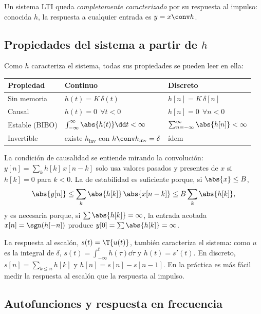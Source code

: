 \documentclass[11pt,a4paper]{scrartcl}
\begin{document}
\begin{importante}[Consecuencia]
  Un sistema LTI queda \emph{completamente caracterizado} por su respuesta al impulso: conocida $h$, la respuesta a cualquier entrada es $y=x\conv h$.
\end{importante}

\subsection{Propiedades del sistema a partir de $h$}

Como $h$ caracteriza el sistema, todas sus propiedades se pueden leer en ella:

\begin{center}
  \renewcommand{\arraystretch}{1.35}
  \begin{tabular}{@{}lll@{}}
    \toprule
    Propiedad & Continuo & Discreto\\\midrule
    Sin memoria & $h(t)=K\,\delta(t)$ & $h[n]=K\,\delta[n]$\\
    Causal & $h(t)=0\ \ \forall t<0$ & $h[n]=0\ \ \forall n<0$\\
    Estable (BIBO) & $\int_{-\infty}^{\infty}\abs{h(t)}\dd t<\infty$ & $\sum_{n=-\infty}^{\infty}\abs{h[n]}<\infty$\\
    Invertible & existe $h_{\mathrm{inv}}$ con $h\conv h_{\mathrm{inv}}=\delta$ & ídem\\\bottomrule
  \end{tabular}
\end{center}

La condición de causalidad se entiende mirando la convolución: $y[n]=\sum_kh[k]\,x[n-k]$ solo usa valores pasados y presentes de $x$ si $h[k]=0$ para $k<0$. La de estabilidad es suficiente porque, si $\abs{x}\le B$,
\[
  \abs{y[n]}\le\sum_k\abs{h[k]}\,\abs{x[n-k]}\le B\sum_k\abs{h[k]},
\]
y es necesaria porque, si $\sum\abs{h[k]}=\infty$, la entrada acotada $x[n]=\sgn(h[-n])$ produce $y[0]=\sum\abs{h[k]}=\infty$.

La respuesta al escalón, $s(t)=\T\{u(t)\}$, también caracteriza el sistema: como $u$ es la integral de $\delta$, $s(t)=\int_{-\infty}^{t}h(\tau)\dd\tau$ y $h(t)=s'(t)$. En discreto, $s[n]=\sum_{k\le n}h[k]$ y $h[n]=s[n]-s[n-1]$. En la práctica es más fácil medir la respuesta al escalón que la respuesta al impulso.

\subsection{Autofunciones y respuesta en frecuencia}\label{sec:autofunciones}
\end{document}
